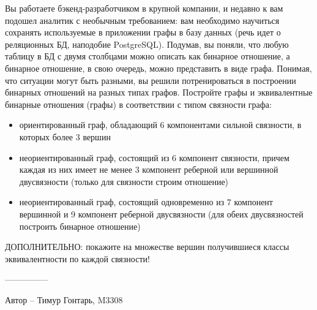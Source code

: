 \question
Вы работаете бэкенд-разработчиком в крупной компании, и недавно к вам подошел аналитик с необычным требованием: вам необходимо научиться сохранять используемые в приложении графы в базу данных (речь идет о реляционных БД, наподобие PostgreSQL). Подумав, вы поняли, что любую таблицу в БД с двумя столбцами можно описать как бинарное отношение, а бинарное отношение, в свою очередь, можно представить в виде графа. Понимая, что ситуации могут быть разными, вы решили потренироваться в построении бинарных отношений на разных типах графов. Постройте графы и эквивалентные бинарные отношения (графы) в соответствии с типом связности графа:

\begin{itemize}
\item ориентированный граф, обладающий 6 компонентами сильной связности, в которых более 3 вершин
\item неориентированный граф, состоящий из 6 компонент связности, причем каждая из них имеет не менее 3 компонент реберной или вершинной двусвязности (только для связности строим отношение)
\item неориентированный граф, состоящий одновременно из 7 компонент вершинной и 9 компонент реберной двусвязности (для обеих двусвязностей построить бинарное отношение)
\end{itemize}
ДОПОЛНИТЕЛЬНО: покажите на множестве вершин получившиеся классы эквивалентности по каждой связности!

---------------

Автор -- Тимур Гонтарь, M3308